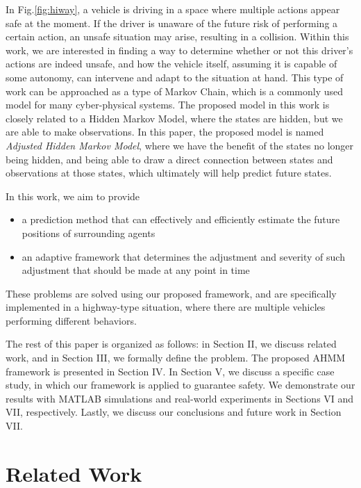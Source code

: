 \documentclass[conference]{IEEEtran}
\begin{document}
    In Fig.\ref{fig:hiway}, a vehicle is driving in a space where multiple actions appear safe at the moment. If the driver is unaware of the future risk of performing a certain action, an unsafe situation may arise, resulting in a collision.
    Within this work, we are interested in finding a way to determine whether or not this driver's actions are indeed unsafe, and how the vehicle itself, assuming it is capable of some autonomy, can intervene and adapt to the situation at hand. This type of work can be approached as a type of Markov Chain, which is a commonly used model for many cyber-physical systems. The proposed model in this work is closely related to a Hidden Markov Model, where the states are hidden, but we are able to make observations. In this paper, the proposed model is named \textit{Adjusted Hidden Markov Model}, where we have the benefit of the states no longer being hidden, and being able to draw a direct connection between states and observations at those states, which ultimately will help predict future states. 
    
     In this work, we aim to provide
    \begin{itemize}
    \item{a prediction method that can effectively and efficiently estimate the future positions of surrounding agents}
    \item{an adaptive framework that determines the adjustment and severity of such adjustment that should be made at any point in time}
    \end{itemize}
  
    These problems are solved using our proposed framework, and are specifically implemented in a highway-type situation, where there are multiple vehicles performing different behaviors.
    
    
    The rest of this paper is organized as follows: in Section II, we discuss related work, and in Section III, we formally define the problem. The proposed AHMM framework is presented in Section IV. In Section V, we discuss a specific case study, in which our framework is applied to guarantee safety. We demonstrate our results with MATLAB simulations and real-world experiments in Sections VI and VII, respectively. Lastly, we discuss our conclusions and future work in Section VII.

    

\section{Related Work}
\end{document}
